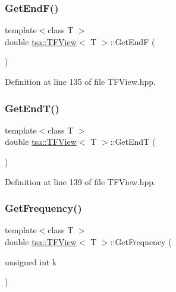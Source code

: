 \mbox{\label{classtsa_1_1_t_f_view_a0dcfff88b1560da2c7999cce2d636fd7}} 
\subsubsection{\texorpdfstring{Get\+End\+F()}{GetEndF()}}
{\footnotesize\ttfamily template$<$class T $>$ \\
double \hyperlink{classtsa_1_1_t_f_view}{tsa\+::\+T\+F\+View}$<$ T $>$\+::Get\+EndF (\begin{DoxyParamCaption}{ }\end{DoxyParamCaption})\hspace{0.3cm}{\ttfamily [inline]}}



Definition at line 135 of file T\+F\+View.\+hpp.

\mbox{\label{classtsa_1_1_t_f_view_a61bc73548b5e9e568a5b5e692dfecde7}} 
\subsubsection{\texorpdfstring{Get\+End\+T()}{GetEndT()}}
{\footnotesize\ttfamily template$<$class T $>$ \\
double \hyperlink{classtsa_1_1_t_f_view}{tsa\+::\+T\+F\+View}$<$ T $>$\+::Get\+EndT (\begin{DoxyParamCaption}{ }\end{DoxyParamCaption})\hspace{0.3cm}{\ttfamily [inline]}}



Definition at line 139 of file T\+F\+View.\+hpp.

\mbox{\label{classtsa_1_1_t_f_view_a13f50c0e460377632ccc771e196df064}} 
\subsubsection{\texorpdfstring{Get\+Frequency()}{GetFrequency()}}
{\footnotesize\ttfamily template$<$class T $>$ \\
double \hyperlink{classtsa_1_1_t_f_view}{tsa\+::\+T\+F\+View}$<$ T $>$\+::Get\+Frequency (\begin{DoxyParamCaption}\item[{unsigned int}]{k }\end{DoxyParamCaption})\hspace{0.3cm}{\ttfamily [inline]}}



